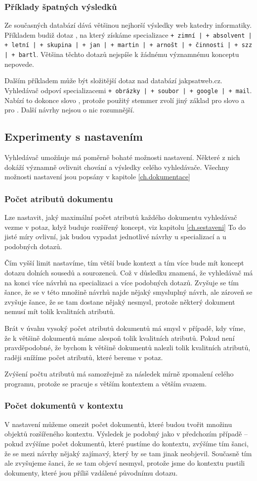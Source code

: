 \documentclass[12pt]{article}
\newcommand{\code}[1]{\texttt{#1}}
\newcommand{\ssection}[1]{\subsection{#1}}
\newcommand{\sssection}[1]{\subsubsection{#1}}
\begin{document}
\sssection{Příklady špatných výsledků}

Ze současných databází dává většinou nejhorší výsledky web katedry informatiky. Příkladem budiž dotaz , na který získáme specializace \code{+ zimní | + absolvent | + letní | + skupina | + jan | + martin | + arnošt | + činnosti | + szz | + bartl}. Většina těchto dotazů nejspíše k žádnému významnému konceptu nepovede. 

Dalším příkladem může být složitější dotaz  nad databází jakpsatweb.cz. Vyhledávač odpoví specializacemi \code{+ obrázky | + soubor | + google | + mail}. Nabízí to dokonce slovo , protože použitý stemmer zvolí jiný základ pro slovo  a pro . Další návrhy nejsou o nic rozumnější. 


\ssection{Experimenty s nastavením}
Vyhledávač umožňuje má poměrně bohaté možnosti nastavení. Některé z nich dokáží významně ovlivnit chování a výsledky celého vyhledávače. Všechny možnosti nastavení jsou popsány v kapitole \ref{ch.dokumentace}

\sssection{Počet atributů dokumentu}
Lze nastavit, jaký maximální počet atributů každého dokumentu vyhledávač vezme v potaz, když buduje rozšířený koncept, viz kapitolu \ref{ch.sestaveni} To do jisté míry ovlivní, jak budou vypadat jednotlivé návrhy u specializací a u podobných dotazů. 

Čím vyšší limit nastavíme, tím větší bude kontext a tím více bude mít koncept dotazu dolních sousedů a sourozenců. Což v důsledku znamená, že vyhledávač má na konci více návrhů na specializaci a více podobných dotazů. Zvyšuje se tím šance, že se v této množině návrhů najde nějaký smysluplný návrh, ale zároveň se zvyšuje šance, že se tam dostane nějaký nesmysl, protože některý dokument nemusí mít tolik kvalitních atributů. 

Brát v úvahu vysoký počet atributů dokumentů má smysl v případě, kdy víme, že k většině dokumentů máme alespoň tolik kvalitních atributů. Pokud není pravděpodobné, že bychom k většině dokumentů nalezli tolik kvalitních atributů, raději snížíme počet atributů, které bereme v potaz. 

Zvýšení počtu atributů má samozřejmě za následek mírně zpomalení celého programu, protože se pracuje s větším kontextem a větším svazem. 

\sssection{Počet dokumentů v kontextu}
V nastavení můžeme omezit počet dokumentů, které budou tvořit množinu objektů rozšířeného kontextu. Výsledek je podobný jako v předchozím případě -- pokud zvýšíme počet dokumentů, které pustíme do kontextu, zvýšíme tím šanci, že se mezi návrhy nějaký zajímavý, který by se tam jinak neobjevil. Současně tím ale zvyšujeme šanci, že se tam objeví nesmysl, protože jsme do kontextu pustili dokumenty, které jsou příliš vzdálené původnímu dotazu.
\end{document}
